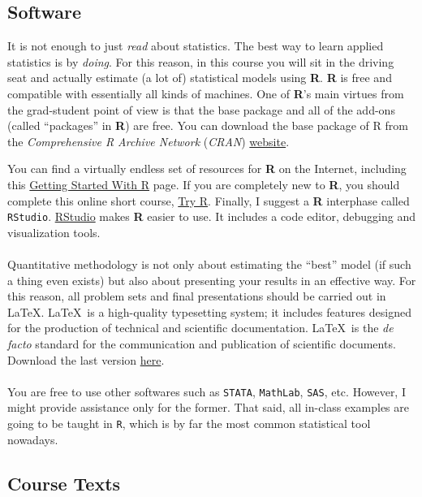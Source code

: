 \documentclass[letterpaper]{article}
\begin{document}
\subsection*{Software}

It is not enough to just \emph{read} about statistics. The best way to learn applied statistics is by \emph{doing}. For this reason, in this course you will sit in the driving seat and actually estimate (a lot of) statistical models using {\bf R}. {\bf R} is free and compatible with essentially all kinds of machines. One of {\bf R}'s main virtues from the grad-student point of view is that the base package and all of the add-ons (called ``packages'' in {\bf R}) are free. You can download the base package of R from the \emph{Comprehensive R Archive Network} (\emph{CRAN}) \href{http://www.cran.r-project.org}{website}.  

You can find a virtually endless set of resources for {\bf R} on the Internet, including this \href{http://scs.math.yorku.ca/index.php/R:_Getting_started_with_R}{Getting Started With R} page. If you are completely new to {\bf R}, you should complete this online short course, \href{http://tryr.codeschool.com/}{Try R}. Finally, I suggest a {\bf R} interphase called \texttt{RStudio}. \href{https://www.rstudio.com/products/rstudio/download/}{RStudio} makes {\bf R} easier to use. It includes a code editor, debugging and visualization tools.
\\
\\
Quantitative methodology is not only about estimating the ``best'' model (if such a thing even exists) but also about presenting your results in an effective way. For this reason, all problem sets and final presentations should be carried out in \LaTeX. \LaTeX\, is a high-quality typesetting system; it includes features designed for the production of technical and scientific documentation. \LaTeX\, is the \emph{de facto} standard for the communication and publication of scientific documents. Download the last version \href{https://www.latex-,roject.org/get/}{here}.
\\
\\
You are free to use other softwares such as \texttt{STATA}, \texttt{MathLab}, \texttt{SAS}, etc. However, I might provide assistance only for the former. That said, all in-class examples are going to be taught in \texttt{R}, which is by far the most common statistical tool nowadays. 

\subsection*{Course Texts}
\end{document}
